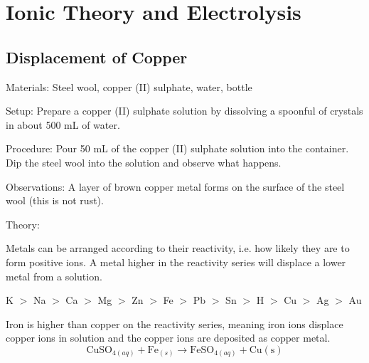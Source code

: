 \section{Ionic Theory and Electrolysis}

\begin{multicols}{2}


\subsection{Displacement of Copper} 


\begin{description*}
\item[Materials:]{Steel wool, copper (II) sulphate, water, bottle}
\item[Setup:]{Prepare a copper (II) sulphate solution by dissolving a spoonful of crystals in about 500 mL of water.}
\item[Procedure:]{Pour 50 mL of the copper (II) sulphate solution into the container. Dip the steel wool into the solution and observe what happens.}
\item[Observations:]{A layer of brown copper metal forms on the surface of the steel wool (this is not rust).}
\item[Theory:]{

Metals can be arranged according to their reactivity, i.e. how likely they are to form positive ions. A metal higher in the reactivity series will displace a lower metal from a solution. 
\begin{center}
K $>$ Na $>$ Ca $>$ Mg $>$ Zn $>$ Fe $>$ Pb $>$ Sn $>$ H $>$ Cu $>$ Ag $>$ Au
\end{center}
Iron is higher than copper on the reactivity series, meaning iron ions displace copper ions in solution and the copper ions are deposited as copper metal. $$ \mathrm{CuSO}_{4(aq)} + \mathrm{Fe}_{(s)} \longrightarrow \mathrm{FeSO}_{4(aq)} + \mathrm{Cu(s)} $$}
\end{description*}


\end{multicols}
